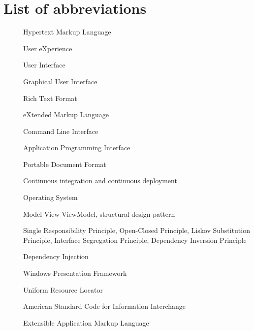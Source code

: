 \chapter*{List of abbreviations}

\begin{multicols}{2}
    \raggedright
    \begin{description}
        \item [] Hypertext Markup Language
        \item [] User eXperience
        \item [] User Interface
        \item [] Graphical User Interface
        \item [] Rich Text Format
        \item [] eXtended Markup Language
        \item [] Command Line Interface
        \item [] Application Programming Interface
        \item [] Portable Document Format
        \item [] Continuous integration and continuous deployment
        \item [] Operating System
        \item [] Model View ViewModel, structural design pattern
        \item [] Single Responsibility Principle, Open-Closed Principle, Liskov Substitution Principle, Interface Segregation Principle, Dependency Inversion Principle
        \item [] Dependency Injection
        \item [] Windows Presentation Framework
        \item [] Uniform Resource Locator
        \item [] American Standard Code for Information Interchange
        \item [] Extensible Application Markup Language
    \end{description}
\end{multicols}

